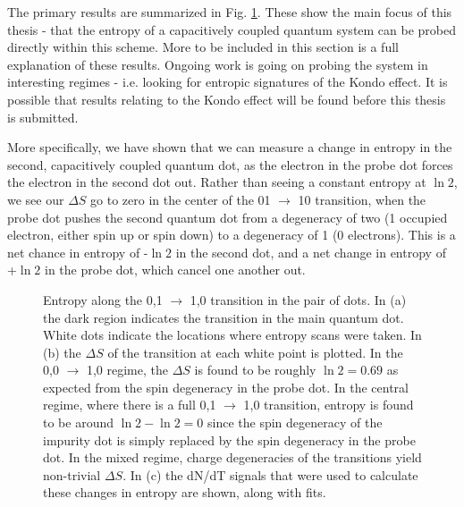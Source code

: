 The primary results are summarized in Fig. \ref{fig:results1}. These show the main focus of this thesis - that the entropy of a capacitively coupled quantum system can be probed directly within this scheme. More to be included in this section is a full explanation of these results. Ongoing work is going on probing the system in interesting regimes - i.e. looking for entropic signatures of the Kondo effect. It is possible that results relating to the Kondo effect will be found before this thesis is submitted. 

More specifically, we have shown that we can measure a change in entropy in the second, capacitively coupled quantum dot, as the electron in the probe dot forces the electron in the second dot out. Rather than seeing a constant entropy at $\ln 2$, we see our $\Delta S$ go to zero in the center of the 01 $\to$ 10 transition, when the probe dot pushes the second quantum dot from a degeneracy of two (1 occupied electron, either spin up or spin down) to a degeneracy of 1 (0 electrons). This is a net chance in entropy of -$\ln 2$ in the second dot, and a net change in entropy of +$\ln 2$ in the probe dot, which cancel one another out.
\begin{figure}[h]
\centering
{}
\caption{Entropy along the 0,1 $\to$ 1,0 transition in the pair of dots. In (a) the dark region indicates the transition in the main quantum dot. White dots indicate the locations where entropy scans were taken. In (b) the $\Delta S$ of the transition at each white point is plotted. In the 0,0 $\to$ 1,0 regime, the $\Delta S$ is found to be roughly $\ln 2 = 0.69$ as expected from the spin degeneracy in the probe dot. In the central regime, where there is a full 0,1 $\to$ 1,0 transition, entropy is found to be around $\ln 2 - \ln2 = 0$ since the spin degeneracy of the impurity dot is simply replaced by the spin degeneracy in the probe dot. In the mixed regime, charge degeneracies of the transitions yield non-trivial $\Delta S$. In (c) the dN/dT signals that were used to calculate these changes in entropy are shown, along with fits.}

\label{fig:results1}       %
\end{figure}

